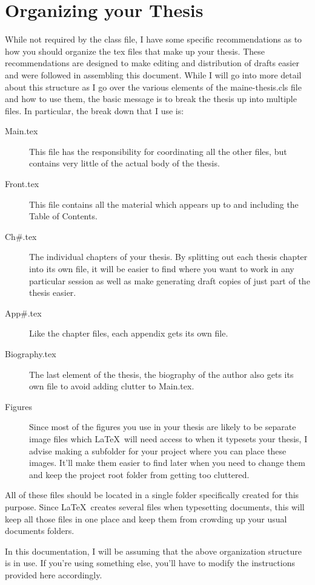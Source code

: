 \section{Organizing your Thesis}
While not required by the class file, I have some specific recommendations as to how you should organize the tex files that make up your thesis.  These recommendations are designed to make editing and distribution of drafts easier and were followed in assembling this document.  While I will go into more detail about this structure as I go over the various elements of the maine-thesis.cls file and how to use them, the basic message is to break the thesis up into multiple files.  In particular, the break down that I use is:
\begin{description}
\item[Main.tex] This file has the responsibility for coordinating all the other files, but contains very little of the actual body of the thesis.
\item[Front.tex] This file contains all the material which appears up to and including the Table of Contents.
\item[Ch\#.tex] The individual chapters of your thesis.  By splitting out each thesis chapter into its own file, it will be easier to find where you want to work in any particular session as well as make generating draft copies of just part of the thesis easier.
\item[App\#.tex] Like the chapter files, each appendix gets its own file.
\item[Biography.tex] The last element of the thesis, the biography of the author also gets its own file to avoid adding clutter to Main.tex.
\item[Figures] Since most of the figures you use in your thesis are likely to be separate image files which \LaTeX\ will need access to when it typesets your thesis, I advise making a subfolder for your project where you can place these images.  It'll make them easier to find later when you need to change them and keep the project root folder from getting too cluttered.
\end{description}

All of these files should be located in a single folder specifically created for this purpose.  Since \LaTeX\ creates several files when typesetting documents, this will keep all those files in one place and keep them from crowding up your usual documents folders.

In this documentation, I will be assuming that the above organization structure is in use.  If you're using something else, you'll have to modify the instructions provided here accordingly.


